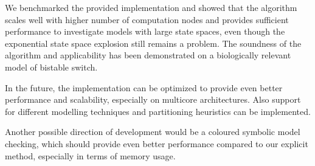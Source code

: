 \documentclass[12pt,oneside,draft]{fithesis2}
\begin{document}
		We benchmarked the provided implementation and showed that the algorithm scales well with higher number of computation nodes and provides sufficient performance to investigate models with large state spaces, even though the exponential state space explosion still remains a problem. The soundness of the algorithm and applicability has been demonstrated on a biologically relevant model of bistable switch.
		
		In the future, the implementation can be optimized to provide even better performance and scalability, especially on multicore architectures. Also support for different modelling techniques and partitioning heuristics can be implemented.
		
		Another possible direction of development would be a coloured symbolic model checking, which should provide even better performance compared to our explicit method, especially in terms of memory usage. 
		
		
		
			
					
      
	
	
\end{document}
